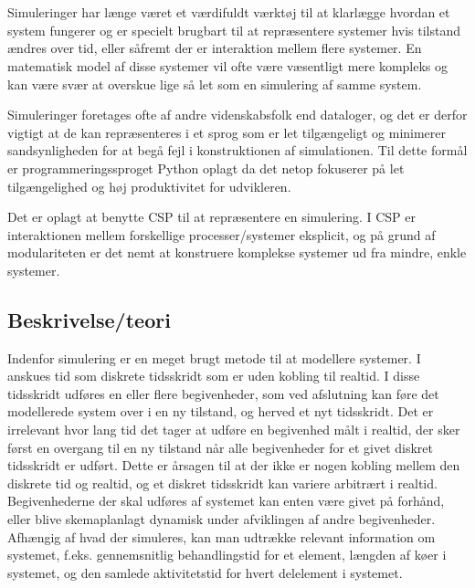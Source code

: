 \chapter{\Des}

Simuleringer har længe været et værdifuldt værktøj til at klarlægge hvordan et 
system fungerer og er specielt brugbart til at repræsentere systemer hvis 
tilstand ændres over tid, eller såfremt der er interaktion mellem flere systemer. En 
matematisk model af disse systemer vil ofte være væsentligt mere kompleks og 
kan være svær at overskue lige så let som en simulering af samme system. 



Simuleringer foretages ofte af andre videnskabsfolk end dataloger, og det er 
derfor vigtigt at de kan repræsenteres i et sprog som er let tilgængeligt og 
minimerer sandsynligheden for at begå fejl i konstruktionen af simulationen.  
Til dette formål er programmeringssproget Python oplagt da det netop fokuserer 
på let tilgængelighed og høj produktivitet for udvikleren. 

Det er oplagt at benytte CSP\cite{hoare-csp} til at repræsentere en simulering.  
I CSP er interaktionen mellem forskellige processer/systemer eksplicit, og på 
grund af modulariteten er det nemt at konstruere komplekse systemer ud fra 
mindre, enkle systemer. 

\section{Beskrivelse/teori} \label{sec:des-teori}


Indenfor simulering er \des en meget brugt metode til at modellere systemer. I 
\des anskues tid som diskrete tidsskridt som er uden kobling til realtid. I 
disse tidsskridt udføres en eller flere begivenheder, som ved afslutning kan 
føre det modellerede system over i en ny tilstand, og herved et nyt tidsskridt. 
Det er irrelevant hvor lang tid det tager at udføre en begivenhed målt i 
realtid, der sker først en overgang til en ny tilstand når alle begivenheder 
for et givet diskret tidsskridt er udført. Dette er årsagen til at der ikke er 
nogen kobling mellem den diskrete tid og realtid, og et diskret tidsskridt kan 
variere arbitrært i realtid. Begivenhederne der skal udføres af systemet kan 
enten være givet på forhånd, eller blive skemaplanlagt dynamisk under afviklingen 
af andre begivenheder. 
Afhængig af hvad der simuleres, kan man udtrække relevant information om systemet, f.eks. gennemsnitlig behandlingstid for et element, længden af køer i systemet, og den samlede aktivitetstid for hvert delelement i systemet. 


